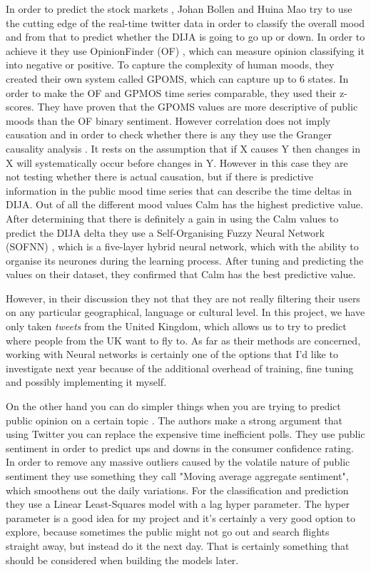 \documentclass[minf,twoside,singlespacing,parskip,frontabs,notimes,11pt]{infthesis}
\begin{document}
In order to predict the stock markets \cite{twitstock}, Johan Bollen and Huina Mao try to use the cutting edge of the real-time twitter data in order to classify the overall mood and from that to predict whether the DIJA \cite{dija} is going to go up or down. In order to achieve it they use OpinionFinder (OF) \cite{opfind}, which can measure opinion classifying it into negative or positive. To capture the complexity of human moods, they created their own system called GPOMS, which can capture up to 6 states. 
In order to make the OF and GPMOS time series comparable, they used their z-scores. They have proven that the GPOMS values are more descriptive of public moods than the OF binary sentiment. However correlation does not imply causation and in order to check whether there is any they use the Granger causality analysis \cite{granger}. It rests on the assumption that if X causes Y then changes in X will systematically occur before changes in Y. However in this case they are not testing whether there is actual causation, but if there is predictive information in the public mood time series that can describe the time deltas in DIJA. Out of all the different mood values Calm has the highest predictive value. After determining that there is definitely a gain in using the Calm values to predict the DIJA delta they use a Self-Organising Fuzzy Neural Network (SOFNN) \cite{sofnn}, which is a five-layer hybrid neural network, which with the ability to organise its neurones during the learning process. After tuning and predicting the values on their dataset, they confirmed that Calm has the best predictive value. 

However, in their discussion they not that they are not really filtering their users on any particular geographical, language or cultural level. In this project, we have only taken \emph{tweets} from the United Kingdom, which allows us to try to predict where people from the UK want to fly to. As far as their methods are concerned, working with Neural networks is certainly one of the options that I'd like to investigate next year because of the additional overhead of training, fine tuning and possibly implementing it myself.


On the other hand you can do simpler things when you are trying to predict public opinion on a certain topic \cite{twitpoll}. The authors make a strong argument that using Twitter you can replace the expensive time inefficient polls. They use public sentiment in order to predict ups and downs in the consumer confidence rating. In order to remove any massive outliers caused by the volatile nature of public sentiment they use something they call "Moving average aggregate sentiment", which smoothens out the daily variations. For the classification and prediction they use a Linear Least-Squares model with a lag hyper parameter. The hyper parameter is a good idea for my project and it's certainly a very good option to explore, because sometimes the public might not go out and search flights straight away, but instead do it the next day. That is certainly something that should be considered when building the models later.
\end{document}
